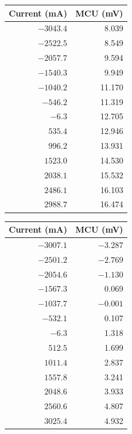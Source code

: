 \documentclass[12pt,a4paper]{article}
\begin{document}
\begin{table}[H]
    \begin{minipage}[t]{0.48\textwidth}
        \centering
        \small
        \begin{tabular}{@{}rr@{}}
            \toprule
            Current (mA) & MCU (mV) \\
            \midrule
            \(-3043.4\) & 8.039 \\
            \(-2522.5\) & 8.549 \\
            \(-2057.7\) & 9.594 \\
            \(-1540.3\) & 9.949 \\
            \(-1040.2\) & 11.170 \\
            \(-546.2\) & 11.319 \\
            \(-6.3\) & 12.705 \\
            $535.4$ & 12.946 \\
            $996.2$ & 13.931 \\
            $1523.0$ & 14.530 \\
            $2038.1$ & 15.532 \\
            $2486.1$ & 16.103 \\
            $2988.7$ & 16.474 \\
            \bottomrule
        \end{tabular}
    \end{minipage}\hfill
    \begin{minipage}[t]{0.48\textwidth}
        \centering
        \small 
        \begin{tabular}{@{}rr@{}}
            \toprule
            Current (mA) & MCU (mV) \\
            \midrule
            \(-3007.1\) & \(-3.287\) \\
            \(-2501.2\) & \(-2.769\) \\
            \(-2054.6\) & \(-1.130\) \\
            \(-1567.3\) & 0.069 \\
            \(-1037.7\) & \(-0.001\) \\
            \(-532.1\) & 0.107 \\
            \(-6.3\) & 1.318 \\
            $512.5$ & 1.699 \\
            $1011.4$ & 2.837 \\
            $1557.8$ & 3.241 \\
            $2048.6$ & 3.933 \\
            $2560.6$ & 4.807 \\
            $3025.4$ & 4.932 \\
            \bottomrule
        \end{tabular}
    \end{minipage}
    
\end{table}
\end{document}
